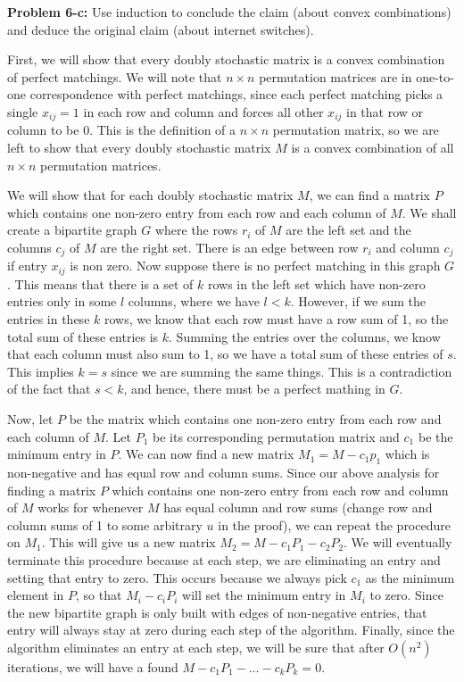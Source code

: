 \documentclass[psamsfonts]{amsart}
\newenvironment{sol}{\vspace{0.25cm}{\large \bfseries Solution:}}{\qedsymbol}
\newenvironment{prob}[1]{\begin{framed}{\large \bfseries Problem #1:}}{\end{framed}}
\begin{document}
\begin{prob}{6-c}
Use induction to conclude the claim (about convex combinations) and deduce the original claim (about internet switches).
\end{prob}
\begin{sol}
First, we will show that every doubly stochastic matrix is a convex combination of perfect matchings. We will note that $n \times n$ permutation matrices are in one-to-one correspondence with perfect matchings, since each perfect matching picks a single $x_{ij} = 1$ in each row and column and forces all other $x_{ij}$ in that row or column to be 0. This is the definition of a $n \times n$ permutation matrix, so we are left to show that every doubly stochastic matrix $M$ is a convex combination of all $n \times n$ permutation matrices. 

We will show that for each doubly stochastic matrix $M$, we can find a matrix $P$ which contains one non-zero entry from each row and each column of $M$. We shall create a bipartite graph $G$ where the rows $r_i$ of $M$ are the left set and the columns $c_j$ of $M$ are the right set. There is an edge between row $r_i$ and column $c_j$ if entry $x_{ij}$ is non zero. Now suppose there is no perfect matching in this graph $G$. This means that there is a set of $k$ rows in the left set which have non-zero entries only in some $l$ columns, where we have $l < k$. However, if we sum the entries in these $k$ rows, we know that each row must have a row sum of 1, so the total sum of these entries is $k$. Summing the entries over the columns, we know that each column must also sum to 1, so we have a total sum of these entries of $s$. This implies $k = s$ since we are summing the same things. This is a contradiction of the fact that $s < k$, and hence, there must be a perfect mathing in $G$. 

Now, let $P$ be the matrix which contains one non-zero entry from each row and each column of $M$. Let $P_1$ be its corresponding permutation matrix and $c_1$ be the minimum entry in $P$. We can now find a new matrix $M_1 = M - c_1 p_1$ which is non-negative and has equal row and column sums. Since our above analysis for finding a matrix $P$ which contains one non-zero entry from each row and column of $M$ works for whenever $M$ has equal column and row sums (change row and column sums of 1 to some arbitrary $u$ in the proof), we can repeat the procedure on $M_1$. This will give us a new matrix $M_2 = M - c_1 P_1 - c_2 P_2$. We will eventually terminate this procedure because at each step, we are eliminating an entry and setting that entry to zero. This occurs because we always pick $c_1$ as the minimum element in $P$, so that $M_i - c_i P_i$ will set the minimum entry in $M_i$ to zero. Since the new bipartite graph is only built with edges of non-negative entries, that entry will always stay at zero during each step of the algorithm. Finally, since the algorithm eliminates an entry at each step, we will be sure that after $O(n^2)$ iterations, we will have a found $M - c_1 P_1 - \ldots - c_{k} P_k = 0$. 


\end{sol}
\end{document}
